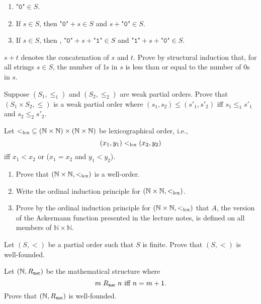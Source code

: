 \documentclass[11pt,fleqn]{article}
\newcommand{\be}{\begin{enumerate}}
\newcommand{\ee}{\end{enumerate}}
\begin{document}
  \be

    \item $\texttt{"0"} \in S$.

    \item If $s \in S$, then $\texttt{"0"} + s \in S$ and $s +
      \texttt{"0"} \in S$.

    \item If $s \in S$, then , $\texttt{"0"} + s + \texttt{"1"} \in S$
      and $\texttt{"1"} + s + \texttt{"0"} \in S$.

  \ee

  $s + t$ denotes the concatenation of $s$ and $t$.  Prove by
  structural induction that, for all strings $s \in S$, the number of
  1s in $s$ is less than or equal to the number of 0s in $s$.

  \item Suppose $(S_1,\le_1)$ and $(S_2,\le_2)$ are weak partial
    orders.  Prove that $(S_1 \times S_2, \le)$ is a weak partial
    order where $(s_1,s_2) \le (s'_1,s'_2)$ iff $s_1 \le_1 s'_1$ and
    $s_2 \le_2 s'_2$.

  \item Let ${<_{\rm lex}} \subseteq (\mathbb{N} \times \mathbb{N})
    \times (\mathbb{N} \times \mathbb{N})$ be lexicographical order,
    i.e., \[(x_1,y_1) <_{\rm lex} (x_2, y_2)\] iff $x_1 < x_2$ or
    ($x_1 = x_2$ and $y_1 < y_2$).  

  \be

    \item Prove that $(\mathbb{N} \times \mathbb{N},<_{\rm lex})$ is a
      well-order.

    \item Write the ordinal induction principle for $(\mathbb{N}
      \times \mathbb{N},<_{\rm lex})$.

    \item Prove by the ordinal induction principle for $(\mathbb{N}
      \times \mathbb{N},<_{\rm lex})$ that $A$, the version of the
      Ackermann function presented in the lecture notes, is defined on
      all members of $\mathbb{N} \times \mathbb{N}$.

  \ee

  \item Let $(S,<)$ be a partial order such that $S$ is finite.  Prove
    that $(S,<)$ is well-founded.

  \item Let $(\mathbb{N},R_{\sf suc})$ be the mathematical structure
    where \[m \mathrel{R_{\sf suc}} n$ iff $n = m + 1.\]  Prove that
    $(\mathbb{N},R_{\sf suc})$ is well-founded.
\end{document}
